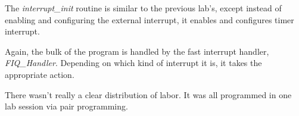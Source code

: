 \documentclass[letterpaper,10pt]{article}
\begin{document}
    \begin{minipage}{\linewidth}
        
        \label{flo:main}
    \end{minipage}

    The \textit{interrupt\_init} routine is similar to the previous lab's,
    except instead of enabling and configuring the external interrupt, it
    enables and configures timer interrupt.

    \begin{minipage}{\linewidth}
        
        \label{flo:interrupt_init}
    \end{minipage}

    Again, the bulk of the program is handled by the fast interrupt handler,
    \textit{FIQ\_Handler}. Depending on which kind of interrupt it is, it takes
    the appropriate action.

    \begin{minipage}{\linewidth}
        
        \label{flo:fiq_handler}
    \end{minipage}

    There wasn't really a clear distribution of labor. It was all programmed in
    one lab session via pair programming.
\end{document}
